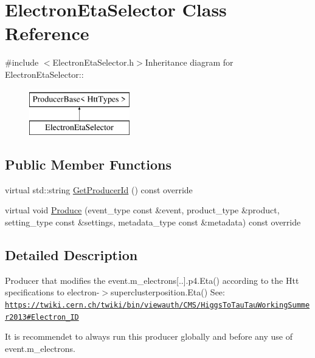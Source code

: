 \hypertarget{classElectronEtaSelector}{
\section{ElectronEtaSelector Class Reference}
\label{classElectronEtaSelector}
}


{\ttfamily \#include $<$ElectronEtaSelector.h$>$}Inheritance diagram for ElectronEtaSelector::\begin{figure}[H]
\begin{center}
\leavevmode
\includegraphics[height=2cm]{classElectronEtaSelector}
\end{center}
\end{figure}
\subsection*{Public Member Functions}
\begin{DoxyCompactItemize}
\item 
virtual std::string \hyperlink{classElectronEtaSelector_a44f2b988ce958eaad34e06e37da02c5c}{GetProducerId} () const override
\item 
virtual void \hyperlink{classElectronEtaSelector_a00d27d0a73fef869f62e9d8d50c05c59}{Produce} (event\_\-type const \&event, product\_\-type \&product, setting\_\-type const \&settings, metadata\_\-type const \&metadata) const override
\end{DoxyCompactItemize}


\subsection{Detailed Description}
Producer that modifies the event.m\_\-electrons\mbox{[}..\mbox{]}.p4.Eta() according to the Htt specifications to electron-\/$>$superclusterposition.Eta() See: \href{https://twiki.cern.ch/twiki/bin/viewauth/CMS/HiggsToTauTauWorkingSummer2013#Electron_ID}{\tt https://twiki.cern.ch/twiki/bin/viewauth/CMS/HiggsToTauTauWorkingSummer2013\#Electron\_\-ID}

It is recommendet to always run this producer globally and before any use of event.m\_\-electrons. 


